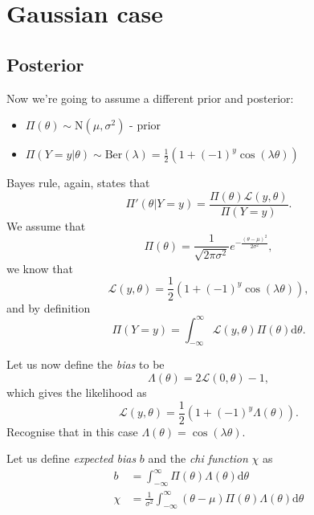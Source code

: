 \documentclass[]{report}
\begin{document}
\section{Gaussian case}
\subsection{Posterior}
Now we're going to assume a different prior and posterior:

\begin{itemize}
	\item $\Pi(\theta) \sim \text{N}(\mu, \sigma^2)$ - prior
	\item $\Pi(Y=y | \theta) \sim \text{Ber}(\lambda) = \frac{1}{2}(1 + (-1)^{y} \cos(\lambda \theta))$
\end{itemize}
Bayes rule, again, states that
\begin{equation}
    \Pi'(\theta|Y = y) = \frac{\Pi(\theta) \mathcal{L} (y, \theta)}{\Pi(Y=y)}.
\end{equation}
We assume that
\begin{equation}
    \Pi(\theta) = \frac{1}{\sqrt{2\pi \sigma^2}} e^{-\frac{(\theta - \mu)^2}{2\sigma^2}},
\end{equation}
we know that
\begin{equation}
    \mathcal{L} (y, \theta) = \frac{1}{2}(1 + (-1)^{y} \cos(\lambda \theta)),
\end{equation}
and by definition
\begin{equation}
\label{eq:normalisation-factor}
    \Pi(Y=y) = \int_{-\infty}^{\infty} \mathcal{L}(y, \theta) \Pi(\theta) \text{d}\theta.
\end{equation}

Let us now define the \textit{bias} to be
\begin{equation}
    \Lambda ( \theta) = 2 \mathcal{L} (0, \theta) - 1,
\end{equation}
which gives the likelihood as
\begin{equation}
    \mathcal{L} (y, \theta) = \frac{1}{2}(1 + (-1)^{y} \Lambda(\theta)).
\end{equation}
Recognise that in this case $\Lambda(\theta) = \cos(\lambda \theta)$.


Let us define \textit{expected bias} $b$ and the \textit{chi function} $\chi$ as
\begin{align}
\label{eq:b}
    b &= \int_{-\infty}^{\infty} \Pi(\theta) \Lambda (\theta) \text{d} \theta\\
\label{eq:chi}
    \chi &= \frac{1}{\sigma^2} \int_{-\infty}^{\infty} (\theta - \mu)\Pi(\theta) \Lambda (\theta) \text{d} \theta
\end{align}
\end{document}

